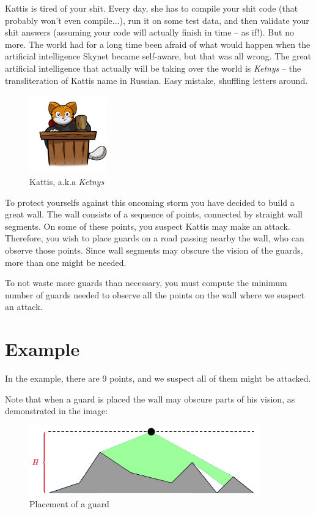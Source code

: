 \newcommand\version{v1}
Kattis is tired of your shit.
Every day, she has to compile your shit code (that probably won't even compile...), run it on some test data, and then validate your shit answers (assuming your code will actually finish in time -- as if!).
But no more.
The world had for a long time been afraid of what would happen when the artificial intelligence Skynet became self-aware, but that was all wrong. The great artificial intelligence that actually will be taking over the world
is \emph{Ketnys} -- the transliteration of Kattis name in Russian. Easy mistake, shuffling letters around.

\begin{figure}[h!]
  \centering
  \includegraphics[width=0.3\textwidth]{kattis.png}
  \caption{Kattis, a.k.a \emph{Ketnys}}
\end{figure}

To protect yourselfs against this oncoming storm you have decided to build a great wall. The wall consists of a sequence of points, connected by straight wall segments.
On some of these points, you suspect Kattis may make an attack. Therefore, you wish to place guards on a road passing nearby the wall, who can observe those points.
Since wall segments may obscure the vision of the guards, more than one might be needed.

To not waste more guards than necessary, you must compute the minimum number of guards needed to observe all the points on the wall where we suspect an attack.

\section*{Example}
In the example, there are 9 points, and we suspect all of them might be attacked.

Note that when a guard is placed the wall may obscure parts of his vision, as demonstrated in the image:
\begin{figure}[h!]
  \centering
  \includegraphics[height=3cm]{imw.png}
  \caption{Placement of a guard}
\end{figure}

